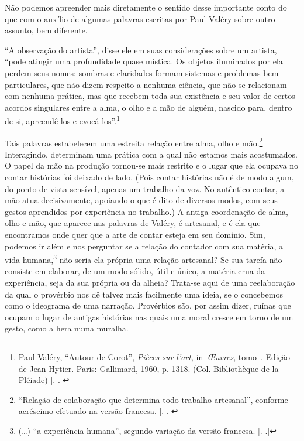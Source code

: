 Não podemos apreender mais diretamente o sentido desse importante conto
do que com o auxílio de algumas palavras escritas por Paul Valéry sobre
outro assunto, bem diferente.

``A observação do artista'', disse ele em suas considerações sobre um
artista, ``pode atingir uma profundidade quase mística. Os objetos
iluminados por ela perdem seus nomes: sombras e claridades formam
sistemas e problemas bem particulares, que não dizem respeito a nenhuma
ciência, que não se relacionam com nenhuma prática, mas que recebem toda
sua existência e seu valor de certos acordos singulares entre a alma, o
olho e a mão de alguém, nascido para, dentro de si, apreendê-los e
evocá-los''.\footnote{Paul Valéry, ``Autour de Corot'', \emph{Pièces sur
  l'art}, in~\emph{Œuvres}, tomo~. Edição de Jean Hytier. Paris:
  Gallimard, 1960, p. 1318. (Col. Bibliothèque de la Pléiade) [. .]}

Tais palavras estabelecem uma estreita relação entre alma, olho e
mão.\footnote{``Relação de colaboração que determina todo trabalho
  artesanal'', conforme acréscimo efetuado na versão francesa. [. 
  .]} Interagindo, determinam uma prática com a qual não estamos mais
acostumados. O papel da mão na produção tornou-se mais restrito e o
lugar que ela ocupava no contar histórias foi deixado de lado. (Pois
contar histórias não é de modo algum, do ponto de vista sensível, apenas
um trabalho da voz. No autêntico contar, a mão atua decisivamente,
apoiando o que é dito de diversos modos, com seus gestos aprendidos por
experiência no trabalho.) A antiga coordenação de alma, olho e mão, que
aparece nas palavras de Valéry, é artesanal, e é ela que encontramos
onde quer que a arte de contar esteja em seu domínio. Sim, podemos ir
além e nos perguntar se a relação do contador com sua matéria, a vida
humana,\footnote{(\ldots{}) ``a experiência humana'', segundo variação da versão
  francesa. [. .]} não seria ela própria uma relação
artesanal? Se sua tarefa não consiste em elaborar, de um modo sólido,
útil e único, a matéria crua da experiência, seja da sua própria ou da
alheia? Trata-se aqui de uma reelaboração da qual o provérbio nos dê
talvez mais facilmente uma ideia, se o concebemos como o ideograma de
uma narração. Provérbios são, por assim dizer, ruínas que ocupam o lugar
de antigas histórias nas quais uma moral cresce em torno de um gesto,
como a hera numa muralha.

